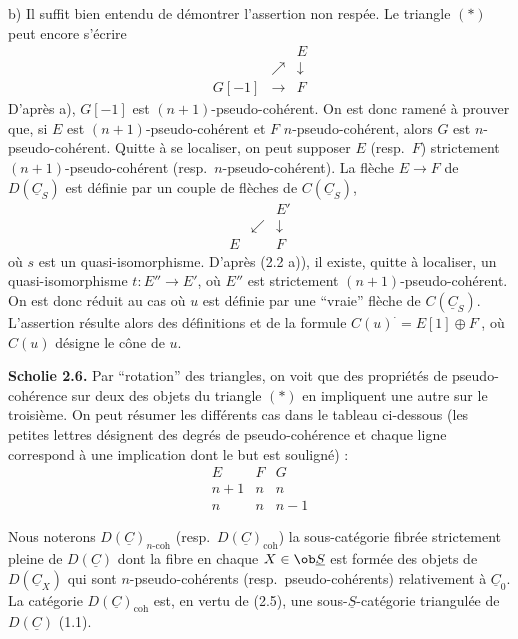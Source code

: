 b) Il suffit bien entendu de démontrer l'assertion non respée. Le triangle $(*)$ peut encore s'écrire
\[
\begin{array}{ccc}
& & E \\
& \nearrow & \downarrow \\
G[-1] & \longrightarrow & F
\end{array}
\]
D'après a), $G[-1]$ est $(n+1)$-pseudo-cohérent. On est donc ramené à prouver que, si $E$ est $(n+1)$-pseudo-cohérent et $F$ $n$-pseudo-cohérent, alors $G$ est $n$-pseudo-cohérent. Quitte à se localiser, on peut supposer $E$ (resp.\ $F$) strictement $(n+1)$-pseudo-cohérent (resp.\ $n$-pseudo-cohérent). La flèche $E \to F$ de $D(\underline{C}_S)$ est définie par un couple de flèches de $C(\underline{C}_S)$,
\[
\begin{array}{ccc}
& & E' \\
& \swarrow & \downarrow \\
E & & F
\end{array}
\]
où $s$ est un quasi-isomorphisme. D'après (2.2 a)), il existe, quitte à localiser, un quasi-isomorphisme $t : E'' \to E'$, où $E''$ est strictement $(n+1)$-pseudo-cohérent. On est donc réduit au cas où $u$ est définie par une ``vraie'' flèche de $C(\underline{C}_S)$. L'assertion résulte alors des définitions et de la formule $C(u)^\cdot = E[1] \oplus F^\cdot$, où $C(u)$ désigne le cône de $u$.

\textbf{Scholie 2.6.} Par ``rotation'' des triangles, on voit que des propriétés de pseudo-cohérence sur deux des objets du triangle $(*)$ en impliquent une autre sur le troisième. On peut résumer les différents cas dans le tableau ci-dessous (les petites lettres désignent des degrés de pseudo-cohérence et chaque ligne correspond à une implication dont le but est souligné) :
\[
\begin{array}{ccc}
E & F & G \\
n+1 & n & n \\
n & n & n-1
\end{array}
\]

Nous noterons $D(\underline{C})_{n\text{-}\mathrm{coh}}$ (resp.\ $D(\underline{C})_{\mathrm{coh}}$) la sous-catégorie fibrée strictement pleine de $D(\underline{C})$ dont la fibre en chaque $X \in \ob \underline{S}$ est formée des objets de $D(\underline{C}_X)$ qui sont $n$-pseudo-cohérents (resp.\ pseudo-cohérents) relativement à $\underline{C}_0$. La catégorie $D(\underline{C})_{\mathrm{coh}}$ est, en vertu de (2.5), une sous-$\underline{S}$-catégorie triangulée de $D(\underline{C})$ (1.1).

